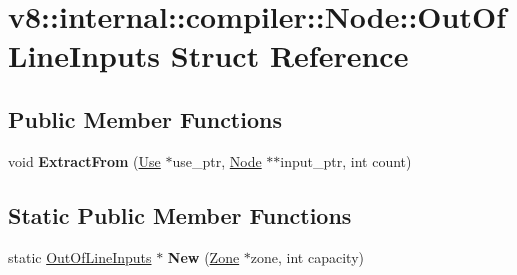 \hypertarget{structv8_1_1internal_1_1compiler_1_1_node_1_1_out_of_line_inputs}{}\section{v8\+:\+:internal\+:\+:compiler\+:\+:Node\+:\+:Out\+Of\+Line\+Inputs Struct Reference}
\label{structv8_1_1internal_1_1compiler_1_1_node_1_1_out_of_line_inputs}
\subsection*{Public Member Functions}
\begin{DoxyCompactItemize}
\item 
void {\bfseries Extract\+From} (\hyperlink{structv8_1_1internal_1_1compiler_1_1_node_1_1_use}{Use} $\ast$use\+\_\+ptr, \hyperlink{classv8_1_1internal_1_1compiler_1_1_node}{Node} $\ast$$\ast$input\+\_\+ptr, int count)\hypertarget{structv8_1_1internal_1_1compiler_1_1_node_1_1_out_of_line_inputs_a9d758ed93a80004a0c5ed8c9317e2885}{}\label{structv8_1_1internal_1_1compiler_1_1_node_1_1_out_of_line_inputs_a9d758ed93a80004a0c5ed8c9317e2885}

\end{DoxyCompactItemize}
\subsection*{Static Public Member Functions}
\begin{DoxyCompactItemize}
\item 
static \hyperlink{structv8_1_1internal_1_1compiler_1_1_node_1_1_out_of_line_inputs}{Out\+Of\+Line\+Inputs} $\ast$ {\bfseries New} (\hyperlink{classv8_1_1internal_1_1_zone}{Zone} $\ast$zone, int capacity)\hypertarget{structv8_1_1internal_1_1compiler_1_1_node_1_1_out_of_line_inputs_a9a519e4d324f2af92096fc3fe47276d8}{}\label{structv8_1_1internal_1_1compiler_1_1_node_1_1_out_of_line_inputs_a9a519e4d324f2af92096fc3fe47276d8}

\end{DoxyCompactItemize}
